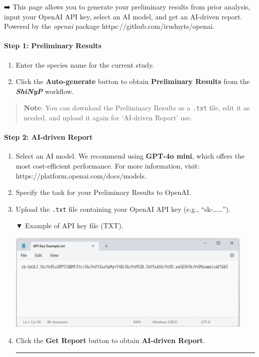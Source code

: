 \documentclass[
]{book}
\begin{document}
➡️ This page allows you to generate your preliminary results from prior analysis, input your OpenAI API key, select an AI model, and get an AI-driven report. Powered by the \emph{openai} package https://github.com/irudnyts/openai.

\paragraph*{Step 1: Preliminary Results}\label{step-1-preliminary-results}

\begin{enumerate}
\def\labelenumi{\arabic{enumi}.}
\item
  Enter the species name for the current study.
\item
  Click the {\textbf{Auto-generate}} button to obtain \textbf{Preliminary Results} from the {\textbf{\emph{ShiNyP}}} workflow.
\end{enumerate}

\begin{quote}
\textbf{Note}: You can download the Preliminary Results as a \texttt{.txt} file, edit it as needed, and upload it again for `AI-driven Report' use.
\end{quote}

\paragraph*{Step 2: AI-driven Report}\label{step-2-ai-driven-report}

\begin{enumerate}
\def\labelenumi{\arabic{enumi}.}
\item
  Select an AI model. We recommend using \textbf{GPT-4o mini}, which offers the most cost-efficient performance. For more information, visit: https://platform.openai.com/docs/models.
\item
  Specify the task for your Preliminary Results to OpenAI.
\item
  Upload the \texttt{.txt} file containing your OpenAI API key (e.g., ``sk-\ldots\ldots{}'').

  ▼ Example of API key file (TXT).

  \includegraphics[width=4.6875in,height=\textheight]{images/clipboard-3104956900.png}
\item
  Click the {\textbf{Get Report}} button to obtain \textbf{AI-driven Report}.

  \begin{center}\rule{0.5\linewidth}{0.5pt}\end{center}
\end{enumerate}
\end{document}
